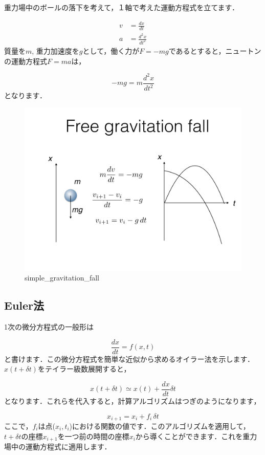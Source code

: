 \documentclass[11pt]{article}
\makeatletter
\def\maxwidth{\ifdim\Gin@nat@width>\linewidth\linewidth
    \else\Gin@nat@width\fi}
\let\Oldincludegraphics\includegraphics
\renewcommand{\includegraphics}[1]{\Oldincludegraphics[width=.8\maxwidth]{#1}}
\makeatother
\begin{document}
重力場中のボールの落下を考えて，１軸で考えた運動方程式を立てます．

\[
\begin{aligned}
v &= \frac{dx}{dt} \\
a &= \frac{d^2 x}{dt^2}
\end{aligned}
\] 質量を\(m\),
重力加速度を\(g\)として，働く力が\(F=-mg\)であるとすると，ニュートンの運動方程式\(F=ma\)は，

\[ 
-mg = m \frac{d^2 x}{dt^2}
\] となります．

\begin{figure}[htbp]
\centering
\includegraphics{../figs/ode.002.jpeg}
\caption{simple\_gravitation\_fall}
\end{figure}

    \subsection{Euler法}\label{eulerux6cd5}

1次の微分方程式の一般形は

\[
\frac{dx}{dt}=f(x,t)
\]
と書けます．この微分方程式を簡単な近似から求めるオイラー法を示します．
\(x(t+\delta t)\)をテイラー級数展開すると，

\[
x(t+\delta t) \simeq x(t) + \frac{dx}{dt} \delta t
\]
となります．これらを代入すると，計算アルゴリズムはつぎのようになります，

\[
x_{i+1} = x_i + f_i\,\delta t
\]
ここで，\(f_i\)は点(\(x_i, t_i\))における関数の値です．このアルゴリズムを適用して，\(t+\delta t\)の座標\(x_{i+1}\)を一つ前の時間の座標\(x_i\)から導くことができます．これを重力場中の運動方程式に適用します．
\end{document}
